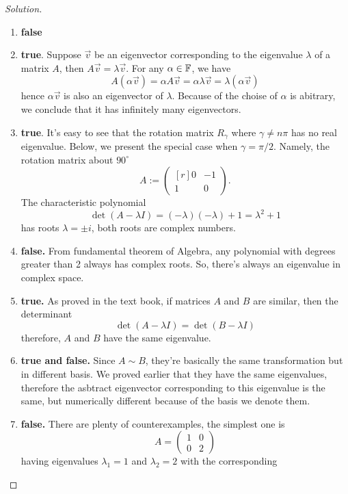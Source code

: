 \documentclass{article}
\begin{document}
\begin{proof}[Solution]
  \begin{enumerate}[label={(\alph*)}]
    \item \textbf{false}
    \item \textbf{true}. Suppose $\vec{v}$ be an eigenvector corresponding to 
      the eigenvalue $\lambda$ of a matrix $A$, then 
      $A\vec{v}=\lambda\vec{v}$. For any $\alpha\in\F$, we have
      \[
        A(\alpha\vec{v})=\alpha A\vec{v}=\alpha\lambda\vec{v}
        =\lambda (\alpha\vec{v})
      \]
      hence $\alpha\vec{v}$ is also an eigenvector of $\lambda$.
      Because of the choise of $\alpha$ is abitrary, we conclude that
      it has infinitely many eigenvectors.
    \item \textbf{true}. It's easy to see that the rotation matrix
      $R_\gamma$ where $\gamma\neq n\pi$ has no real eigenvalue. 
      Below, we present the special case when $\gamma=\pi/2$.
      Namely, the rotation matrix about $90^\circ$ 
      \[
        A:=
        \begin{pmatrix*}[r]
          0 &-1\\ 1&0
        \end{pmatrix*}.
      \]
      The characteristic polynomial 
      \[\det(A-\lambda I)=(-\lambda)(-\lambda)+1=\lambda^2+1\]
      has roots $\lambda=\pm i$, both roots are complex numbers.
    \item \textbf{false.} From fundamental theorem of Algebra,
      any polynomial with degrees greater than 2 always has
      complex roots. So, there's always an eigenvalue in complex
      space.
    \item \textbf{true.} As proved in the text book, if matrices 
      $A$ and $B$ are similar, then the determinant
      \[\det(A-\lambda I)=\det(B-\lambda I)\]
      therefore, $A$ and $B$ have the same eigenvalue.
    \item \textbf{true and false.} Since $A\sim B$, they're basically the same
      transformation but in different basis. We proved earlier that they have
      the same eigenvalues, therefore the asbtract eigenvector corresponding to 
      this eigenvalue is the same, but numerically different because of the 
      basis we denote them.
    \item \textbf{false.} There are plenty of counterexamples, the simplest one is
      \[ A= \begin{pmatrix} 1&0\\ 0&2 \end{pmatrix} \]
      having eigenvalues $\lambda_1=1$ and $\lambda_2=2$ with the corresponding

\end{enumerate}
\end{proof}
\end{document}

